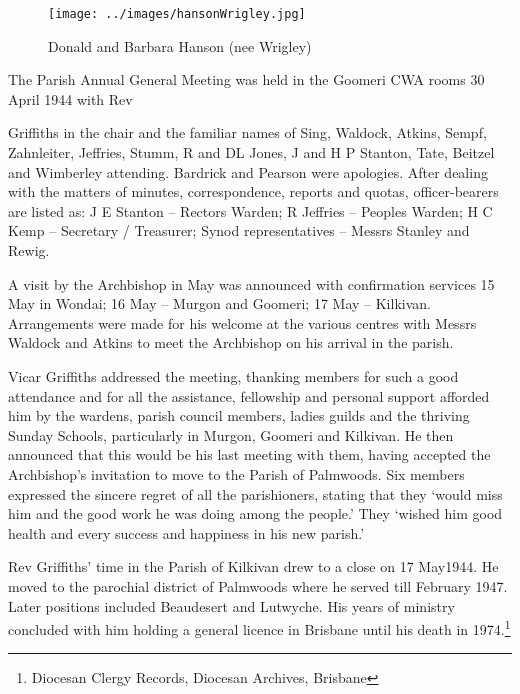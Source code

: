 \begin{figure}
\begin{center}
\texttt{[image: ../images/hansonWrigley.jpg]}
\caption{Donald and Barbara Hanson (nee Wrigley)}
\end{center}
\end{figure}




The Parish Annual General Meeting was held in the Goomeri CWA rooms 30 April 1944 with Rev



Griffiths in the chair and the familiar names of Sing, Waldock, Atkins, Sempf, Zahnleiter, Jeffries, Stumm, R and DL Jones, J and H P Stanton, Tate, Beitzel and Wimberley attending. Bardrick and Pearson were apologies. After dealing with the matters of minutes, correspondence, reports and quotas, officer-bearers are listed as: J E Stanton -- Rectors Warden; R Jeffries -- Peoples Warden; H C Kemp -- Secretary / Treasurer; Synod representatives -- Messrs Stanley and Rewig.



A visit by the Archbishop in May was announced with confirmation services 15 May in Wondai; 16 May -- Murgon and Goomeri; 17 May -- Kilkivan. Arrangements were made for his welcome at the various centres with Messrs Waldock and Atkins to meet the Archbishop on his arrival in the parish.



Vicar Griffiths addressed the meeting, thanking members for such a good attendance and for all the assistance, fellowship and personal support afforded him by the wardens, parish council members, ladies guilds and the thriving Sunday Schools, particularly in Murgon, Goomeri and Kilkivan. He then announced that this would be his last meeting with them, having accepted the Archbishop's invitation to move to the Parish of Palmwoods. Six members expressed the sincere regret of all the parishioners, stating that they `would miss him and the good work he was doing among the people.' They `wished him good health and every success and happiness in his new parish.'



Rev Griffiths' time in the Parish of Kilkivan drew to a close on 17 May1944. He moved to the parochial district of Palmwoods where he served till February 1947. Later positions included Beaudesert and Lutwyche. His years of ministry concluded with him holding a general licence in Brisbane until his death in 1974.\footnote{Diocesan Clergy Records, Diocesan Archives, Brisbane}


